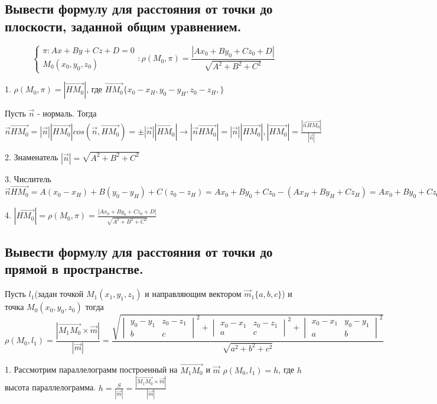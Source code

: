 \documentclass[a4paper, 10pt]{article}
\newcommand{\bvec}[1]{\overrightarrow{#1}}
\renewcommand{\a}{\vec{a}}
\renewcommand{\b}{\vec{b}}
\begin{document}
\subsection{Вывести формулу для расстояния от точки до плоскости, заданной общим уравнением. }

$$\begin{cases}\pi:Ax + By + Cz + D =0\\M_0(x_0, y_0, z_0)\end{cases}:
    \rho (M_0, \pi) = \frac{ |Ax_0 + By_0 + Cz_0 + D| }{\sqrt{A^2+B^2+C^2}}$$

1. $\rho(M_0, \pi) = |\bvec{HM_0}|$, где $\bvec{HM_0}\{x_0-x_H,y_0-y_H,z_0-z_H,\}$

Пусть $\vec{n}$ - нормаль. Тогда $\vec{n}\bvec{HM_0} = |\vec{n}||\bvec{HM_0}|cos(\vec{n}, 
\bvec{HM_0}) = \pm|\vec{n}||\bvec{HM_0}| \rightarrow |\vec{n}\bvec{HM_0}| = 
|\vec{n}||\bvec{HM_0}|, |\bvec{HM_0}| = \frac{ |\vec{n}\bvec{HM_0}| }{ |\vec{n}| }$

2. Знаменатель $|\vec{n}| = \sqrt{A^2+B^2+C^2}$

3. Числитель $\vec{n}\bvec{HM_0} = A(x_0-x_H)+B(y_0-y_H)+C(z_0-z_H) = Ax_0 + By_0 
+ Cz_0 - (Ax_H + By_H + Cz_H) = Ax_0 + By_0 + Cz_0 + D$

4. $|\bvec{HM_0}| = \rho (M_0, \pi) = \frac{ |Ax_0 + By_0 + Cz_0 + D| }{\sqrt{A^2+B^2+C^2}}$

\subsection{Вывести формулу для расстояния от точки до прямой в пространстве.}

Пусть $l_1$(задан точкой $M_1(x_1, y_1, z_1)$ и направляющим вектором $\vec{m}_1\{a,b,c\}$) и точка 
$M_0(x_0,y_0,z_0)$ тогда 
$$\rho(M_0, l_1) = \frac{ |\bvec{M_1M_0}\times\vec{m}| }{ |\vec{m}| } = 
\frac{\sqrt{\begin{vmatrix}y_0-y_1&z_0-z_1\\b&c\end{vmatrix}^2+
\begin{vmatrix}x_0-x_1&z_0-z_1\\a&c\end{vmatrix}^2+
\begin{vmatrix}x_0-x_1&y_0-y_1\\a&b\end{vmatrix}^2}}{\sqrt{a^2+b^2+c^2}}$$

1. Рассмотрим параллелограмм построенный на  $\bvec{M_1M_0}$ и $\vec{m}$
$\rho(M_0, l_1) = h$, где $h$ высота параллелограмма.
$h = \frac{S}{ |\vec{m}| } = \frac{ |\bvec{M_1M_0} \times \vec{m}| }{ |\vec{m}| }$
\end{document}
